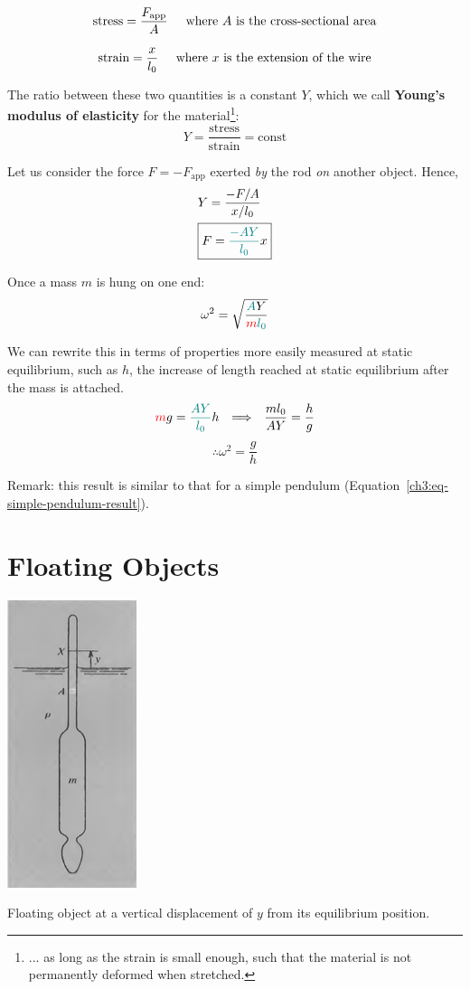 \[ \text{stress} = \frac{F_\text{app}}{A} \hspace{0.5cm}\text{where }\text{$A$ is the cross-sectional area} \]

\[  \text{strain} = \frac{x}{l_0} \hspace{0.5cm}\text{where }\text{$x$ is the extension of the wire}  \]

The ratio between these two quantities is a constant $Y$, which we call \textbf{Young's modulus of elasticity} for the material\footnote{... as long as the strain is small enough, such that the material is not permanently deformed when stretched.}:
\begin{equation}
	\boxed{ Y = \frac{\text{stress}}{\text{strain}} = \text{const}} \label{ch3:eq-Youngs-Modulus}
\end{equation}

Let us consider the force $F = -F_\text{app}$ exerted \emph{by} the rod \emph{on} another object. Hence,
\begin{align}
	& Y = \frac{-F/A}{x/l_0} \notag \\
	& \boxed{F = \textcolor{teal}{\frac{-AY}{l_0}} x } \label{ch3:eq-Youngs-F}
\end{align}


Once a mass $m$ is hung on one end:
\[ \omega^2 = \sqrt{\frac{\textcolor{teal}{A}Y}{\textcolor{red}{m} \textcolor{teal}{l_0}}} \]

We can rewrite this in terms of properties more easily measured at static equilibrium, such as $h$, the increase of length reached at static equilibrium after the mass is attached.
\[ \textcolor{red}{m}g=\textcolor{teal}{\frac{AY}{l_0}} h 
\hspace{0.25cm}\Longrightarrow\hspace{0.25cm}
\frac{ml_0}{AY}=\frac{h}{g} \]
\begin{equation}
\therefore \omega^2 = \frac{g}{h}  \label{ch3:eq-elastic-wire-result}
\end{equation} 

Remark: this result is similar to that for a simple pendulum (Equation~\ref{ch3:eq-simple-pendulum-result}).

\section{Floating Objects} \label{ch3:sec-floating}

\begin{marginfigure}
	\centering
	\includegraphics[scale=0.6]{phys232/Ch3-floating.png}
	\caption{Floating object at a vertical displacement of $y$ from its equilibrium position.}
	\label{ch3:fig-floating}
\end{marginfigure}

